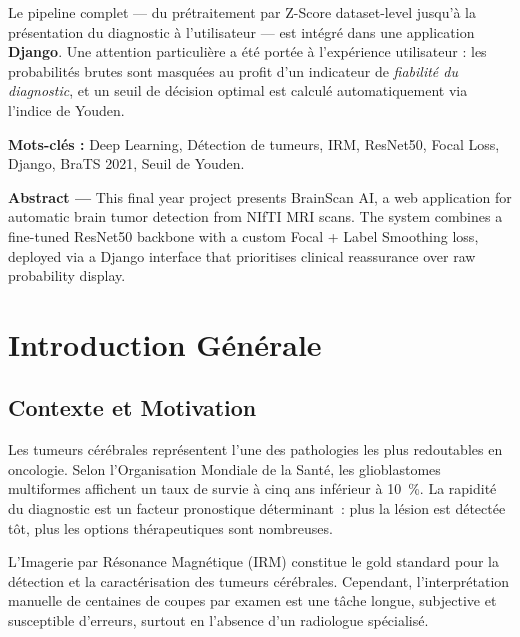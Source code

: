 \documentclass[12pt, a4paper]{report}
\begin{document}
Le pipeline complet — du prétraitement par Z-Score dataset-level jusqu'à
la présentation du diagnostic à l'utilisateur — est intégré dans une
application \textbf{Django}. Une attention particulière a été portée à
l'expérience utilisateur : les probabilités brutes sont masquées au profit
d'un indicateur de \textit{fiabilité du diagnostic}, et un seuil de
décision optimal est calculé automatiquement via l'indice de Youden.

\textbf{Mots-clés :} Deep Learning, Détection de tumeurs, IRM, ResNet50,
Focal Loss, Django, BraTS 2021, Seuil de Youden.

\vspace{1cm}

\textbf{Abstract —} This final year project presents BrainScan AI, a web
application for automatic brain tumor detection from NIfTI MRI scans.
The system combines a fine-tuned ResNet50 backbone with a custom
Focal + Label Smoothing loss, deployed via a Django interface that
prioritises clinical reassurance over raw probability display.

\tableofcontents
\listoffigures
\listoftables
\lstlistoflistings

\cleardoublepage
{}
\setcounter{page}{1}

\chapter{Introduction Générale}
\label{chap:intro}

\section{Contexte et Motivation}

Les tumeurs cérébrales représentent l'une des pathologies les plus
redoutables en oncologie. Selon l'Organisation Mondiale de la Santé,
les glioblastomes multiformes affichent un taux de survie à cinq ans
inférieur à 10~\%. La rapidité du diagnostic est un facteur pronostique
déterminant~: plus la lésion est détectée tôt, plus les options
thérapeutiques sont nombreuses.

L'Imagerie par Résonance Magnétique (IRM) constitue le gold standard
pour la détection et la caractérisation des tumeurs cérébrales.
Cependant, l'interprétation manuelle de centaines de coupes par examen
est une tâche longue, subjective et susceptible d'erreurs, surtout en
l'absence d'un radiologue spécialisé.
\end{document}
